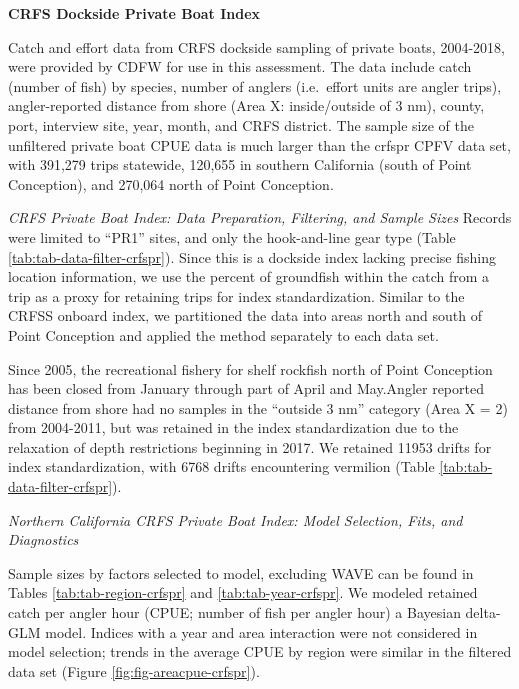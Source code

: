 \documentclass[11pt,
  english,
]{article}
\begin{document}
\leavevmode\tagmcend\tagstructend

\renewcommand{\thepage}{D\arabic{page}}
\renewcommand{\thefigure}{D\arabic{figure}}
\renewcommand{\thetable}{D\arabic{table}}
\setcounter{page}{1}
\setcounter{figure}{0}
\setcounter{table}{0}

\textbf{CRFS Dockside Private Boat Index}

Catch and effort data from CRFS dockside sampling of private boats, 2004-2018, were provided by CDFW for use in this assessment. The data include catch (number of fish) by species, number of anglers (i.e.~effort units are angler trips), angler-reported distance from shore (Area X: inside/outside of 3 nm), county, port, interview site, year, month, and CRFS district. The sample size of the unfiltered private boat CPUE data is much larger than the crfspr CPFV data set, with 391,279 trips statewide, 120,655 in southern California (south of Point Conception), and 270,064 north of Point Conception.

\emph{CRFS Private Boat Index: Data Preparation, Filtering, and Sample Sizes} Records were limited to ``PR1'' sites, and only the hook-and-line gear type (Table \ref{tab:tab-data-filter-crfspr}). Since this is a dockside index lacking precise fishing location information, we use the percent of groundfish within the catch from a trip as a proxy for retaining trips for index standardization. Similar to the CRFSS onboard index, we partitioned the data into areas north and south of Point Conception and applied the method separately to each data set.

Since 2005, the recreational fishery for shelf rockfish north of Point Conception has been closed from January through part of April and May.Angler reported distance from shore had no samples in the ``outside 3 nm'' category (Area X = 2) from 2004-2011, but was retained in the index standardization due to the relaxation of depth restrictions beginning in 2017. We retained 11953 drifts for index standardization, with 6768 drifts encountering vermilion (Table \ref{tab:tab-data-filter-crfspr}).

\emph{Northern California CRFS Private Boat Index: Model Selection, Fits, and Diagnostics}

Sample sizes by factors selected to model, excluding WAVE can be found in Tables \ref{tab:tab-region-crfspr} and \ref{tab:tab-year-crfspr}. We modeled retained catch per angler hour (CPUE; number of fish per angler hour) a Bayesian delta-GLM model. Indices with a year and area interaction were not considered in model selection; trends in the average CPUE by region were similar in the filtered data set (Figure \ref{fig:fig-areacpue-crfspr}).
\end{document}
